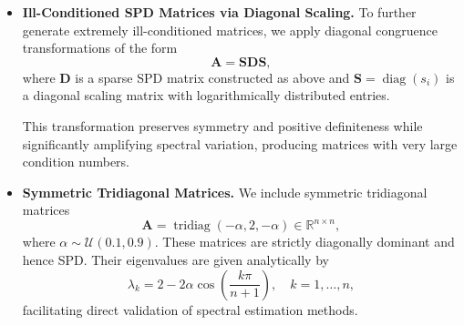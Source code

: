 \documentclass[11pt,a4paper]{article}
\theoremstyle{plain}
\theoremstyle{definition}
\theoremstyle{remark}
\begin{document}
\begin{itemize}
\begin{itemize}
An additional small diagonal perturbation is applied to influence the spectrum. This procedure yields sparse SPD matrices spanning a broad range of conditioning, from moderately to highly ill-conditioned regimes.

\item \textbf{Ill-Conditioned SPD Matrices via Diagonal Scaling.}
To further generate extremely ill-conditioned matrices, we apply diagonal congruence transformations of the form
\begin{equation*}
\mathbf{A} = \mathbf{S} \mathbf{D} \mathbf{S},
\end{equation*}
where $\mathbf{D}$ is a sparse SPD matrix constructed as above and $\mathbf{S} = \operatorname{diag}(s_i)$ is a diagonal scaling matrix with logarithmically distributed entries.  

This transformation preserves symmetry and positive definiteness while significantly amplifying spectral variation, producing matrices with very large condition numbers.

\item \textbf{Symmetric Tridiagonal Matrices.}
We include symmetric tridiagonal matrices
\begin{equation*}
\mathbf{A} = \operatorname{tridiag}(-\alpha, 2, -\alpha) \in \mathbb{R}^{n \times n},
\end{equation*}
where $\alpha \sim \mathcal{U}(0.1, 0.9)$. These matrices are strictly diagonally dominant and hence SPD. Their eigenvalues are given analytically by
\begin{equation*}
\lambda_k = 2 - 2\alpha \cos\left(\frac{k\pi}{n+1}\right), \quad k=1,\dots,n,
\end{equation*}
facilitating direct validation of spectral estimation methods.

\end{itemize}



\end{itemize}
\end{document}
